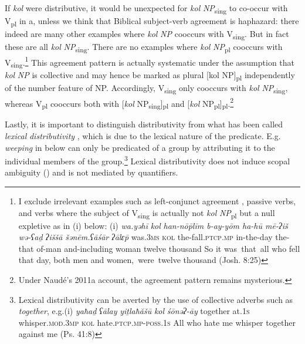 \documentclass[output=paper]{langsci/langscibook}
\begin{document}
If \textit{kol} were distributive, it would be unexpected for \textit{kol} \textit{NP}\textsubscript{sing} to co-occur with V\textsubscript{pl} in a, unless we think that Biblical subject-verb agreement is haphazard: there indeed are many  other examples where \textit{kol} \textit{NP} cooccurs with V\textsubscript{sing}. But in fact these are all \textit{kol} \textit{NP}\textsubscript{sing}. There are no examples where \textit{kol} \textit{NP}\textsubscript{pl} cooccurs with V\textsubscript{sing}.\footnote{I exclude irrelevant examples such as left-conjunct agreement \citep{Doron2005}, passive verbs, and verbs where the subject of \textrm{V}\textrm{\textsubscript{sing}} is actually not \textit{kol} \textit{NP}\textsubscript{pl} but a null expletive as in (i) below: \textrm{(i)}\textrm{  \textit{wa.yəhī}   \textit{kol}   \textit{han-nō}}\textit{\={p}līm         b-ay-yōm  ha-hū    mē-ʔiš  wə-ʕaḏ            ʔiššā     šənēm.ʕā}\textrm{\textit{śār} \textit{ʔālɛ}}\textit{\={p}}  was.\textsc{3ms} \textsc{kol} the-fall.\textsc{ptcp.mp} in-the-day the-that of-man and-including woman twelve         thousand  \textrm{So it was~that~all who fell that day, both men and women,~were~twelve thousand} (Josh. 8:25)} This agreement pattern is actually systematic under the assumption that \textit{kol} \textit{NP} is collective and may hence be marked as plural [kol NP]\textsubscript{pl} independently of the number feature of NP. Accordingly, V\textsubscript{sing} only cooccurs with \textit{kol} \textit{NP}\textsubscript{sing}, whereas V\textsubscript{pl} cooccurs both with [\textit{kol} NP\textsubscript{sing}]\textsubscript{pl} and [\textit{kol} NP\textsubscript{pl}]\textsubscript{pl}.\footnote{Under Naudé’s 2011a account, the agreement pattern remains mysterious.}

Lastly, it is important to distinguish distributivity from what has been called \textit{lexical} \textit{distributivity} \citep{Winter2000}, which is due to the lexical nature of the predicate. E.g. \textit{weeping} in  below can only be predicated of a group by attributing it to the individual members of the group.\footnote{Lexical distributivity can be averted by the use of collective adverbs such as \textit{together}, e.g.\textrm{(i)}\textrm{  \textit{yaħaḏ}     \textit{ʕālay} \textit{yiṯlaħă}}\textit{š}\textrm{\textit{ū}                 \textit{kol}   \textit{ś}}\textit{ōnəʔ-āy}  together at.\textsc{1s}  whisper.\textsc{mod.3mp}  \textsc{kol}  hate.\textsc{ptcp.mp}{}-\textsc{poss.1s}  \textrm{All who hate me whisper together against me} (Ps. 41:8)} Lexical distributivity does not induce scopal ambiguity (\citealt{Vries2017}) and is not mediated by quantifiers.
\end{document}
